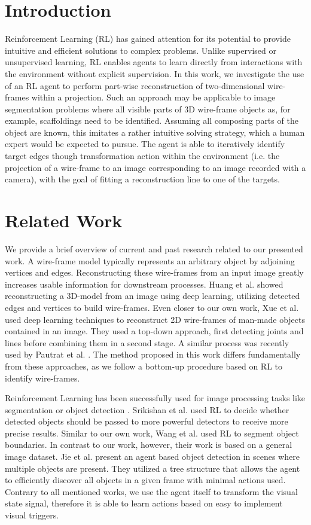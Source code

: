 \documentclass[11pt]{article} %
\begin{document}
\section{Introduction}
Reinforcement Learning (RL) has gained attention for its potential to provide intuitive and efficient solutions to complex problems. Unlike supervised or unsupervised learning, RL enables agents to learn directly from interactions with the environment without explicit supervision.
In this work, we investigate the use of an RL agent to perform part-wise reconstruction of two-dimensional wire-frames within a projection.
Such an approach may be applicable to image segmentation problems where all visible parts of 3D wire-frame objects as, for example, scaffoldings need to be identified. Assuming all composing parts of the object are known, this imitates a rather intuitive solving strategy, which a human expert would be expected to pursue.
The agent is able to iteratively identify target edges though transformation action within the environment (i.e. the projection of a wire-frame to an image corresponding to an image recorded with a camera), with the goal of fitting a reconstruction line to one of the targets.
\section{Related Work}
We provide a brief overview of current and past research related to our presented work.
A wire-frame model typically represents an arbitrary object by adjoining vertices and edges.
Reconstructing these wire-frames from an input image greatly increases usable information for downstream processes.
Huang et al. \cite{huang_learning_2018} showed reconstructing a 3D-model from an image using deep learning, utilizing detected edges and vertices to build wire-frames.
Even closer to our own work, Xue et al. \cite{xue_holistically-attracted_2023} used deep learning techniques to reconstruct 2D wire-frames of man-made objects contained in an image. They used a top-down approach, first detecting joints and lines before combining them in a second stage.
A similar process was recently used by Pautrat et al. \cite{pautrat_deeplsd_2023}.
The method proposed in this work differs fundamentally from these approaches, as we follow a bottom-up procedure based on RL to identify wire-frames.

Reinforcement Learning has been successfully used for image processing tasks like segmentation or object detection \cite{casanova_reinforced_2020}.
Srikishan et al. \cite{srikishan_reinforcement_2024} used RL to decide whether detected objects should be passed to more powerful detectors to receive more precise results.
Similar to our own work, Wang et al. \cite{wang_outline_2018} used RL to segment object boundaries. In contrast to our work, however, their work is based on a general image dataset. 
Jie et al. \cite{jie_tree-structured_2017} present an agent based object detection in scenes where multiple objects are present. They utilized a tree structure that allows the agent to efficiently discover all objects in a given frame with minimal actions used.
Contrary to all mentioned works, we use the agent itself to transform the visual state signal, therefore it is able to learn actions based on easy to implement visual triggers.
\end{document}

